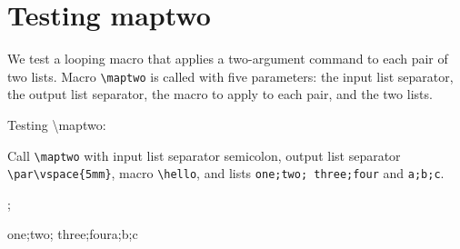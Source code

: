 \documentclass[12pt,\documentclassflag]{lawbrief}
\begin{document}
\section{Testing maptwo}

We test a looping macro that applies a two-argument command to each
pair of two lists. Macro \lstinline|\maptwo| is called with five
parameters: the input list separator, the output list separator, the
macro to apply to each pair, and the two lists.

\begin{LTXexample}
  \long{}
  \def\hello#1#2{hello #1 #2}

  Testing \textbackslash{}maptwo:

  Call \lstinline|\maptwo| with input list separator semicolon,
  output list separator \lstinline|\par\vspace{5mm}|, macro \lstinline|\hello|, and lists
  \lstinline|one;two; three;four| and \lstinline|a;b;c|.
  
  \maptwo;{\par\vspace{5mm}}{\hello}{one;two; three;four}{a;b;c}
  
\end{LTXexample}
\end{document}
